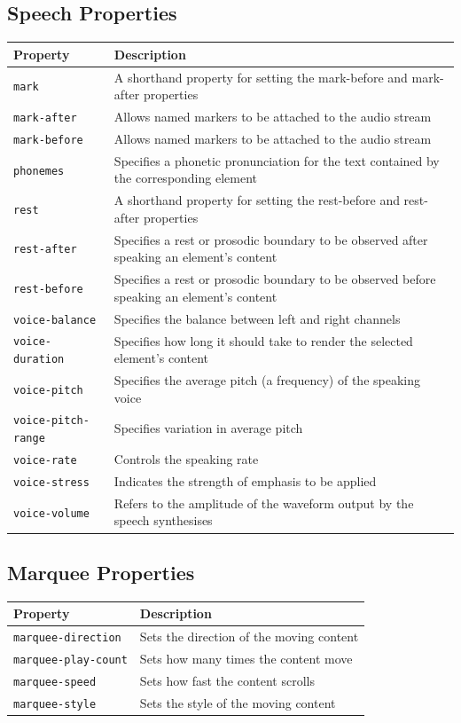\documentclass[11pt, letterpaper]{article}
\begin{document}
		\subsection{Speech Properties}
			\begin{longtable}{p{5cm} p{10cm}}
				\toprule
				Property & Description \\\midrule 
				\texttt{mark} & A shorthand property for setting the mark-before and mark-after properties \\\midrule
				\texttt{mark-after} & Allows named markers to be attached to the audio stream \\\midrule
				\texttt{mark-before} & Allows named markers to be attached to the audio stream \\\midrule
				\texttt{phonemes} & Specifies a phonetic pronunciation for the text contained by the corresponding element \\\midrule
				\texttt{rest} & A shorthand property for setting the rest-before and rest-after properties \\\midrule
				\texttt{rest-after} & Specifies a rest or prosodic boundary to be observed after speaking an element's content \\\midrule
				\texttt{rest-before} & Specifies a rest or prosodic boundary to be observed before speaking an element's content \\\midrule
				\texttt{voice-balance} & Specifies the balance between left and right channels \\\midrule
				\texttt{voice-duration} & Specifies how long it should take to render the selected element's content \\\midrule
				\texttt{voice-pitch} & Specifies the average pitch (a frequency) of the speaking voice \\\midrule
				\texttt{voice-pitch-range} & Specifies variation in average pitch \\\midrule
				\texttt{voice-rate} & Controls the speaking rate \\\midrule
				\texttt{voice-stress} & Indicates the strength of emphasis to be applied \\\midrule
				\texttt{voice-volume} & Refers to the amplitude of the waveform output by the speech synthesises \\\midrule
			\end{longtable}

		\subsection{Marquee Properties}
			\begin{longtable}{p{5cm} p{10cm}}
				\toprule
				Property & Description \\\midrule 
				\texttt{marquee-direction} & Sets the direction of the moving content \\\midrule
				\texttt{marquee-play-count} & Sets how many times the content move \\\midrule
				\texttt{marquee-speed} & Sets how fast the content scrolls \\\midrule
				\texttt{marquee-style} & Sets the style of the moving content \\\midrule
			\end{longtable}
\end{document}
